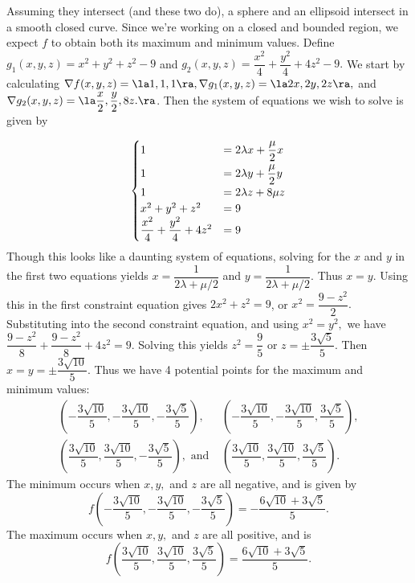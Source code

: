 {Assuming they intersect (and these two do), a sphere and an ellipsoid intersect in a smooth closed curve.  Since we're working on a closed and bounded region, we expect $f$ to obtain both its maximum and minimum values.  Define $g_1(x,y,z) = x^2 + y^2 + z^2 -  9$ and $g_2(x,y,z) = \dfrac{x^2}{4} + \dfrac{y^2}{4} + 4z^2 - 9.$ We start by calculating $\nabla f(x,y,z) = \la 1,1,1 \ra, \nabla g_1(x,y,z) = \la 2x,2y,2z\ra,$ and $\nabla g_2(x,y,z) = \la \dfrac{x}{2}, \dfrac{y}{2}, 8z. \ra$.  Then the system of equations we wish to solve is given by

\[
		\begin{cases}
			                                     1 & = 2\lambda x + \dfrac{\mu}{2} x \smallskip \\
			                                     1 & = 2\lambda y + \dfrac{\mu}{2}y  \\
			                                     1 & =2\lambda z + 8\mu z            \\
			                       x^2 + y^2 + z^2 & = 9                             \\
			\dfrac{x^2}{4} + \dfrac{y^2}{4} + 4z^2 & = 9
		\end{cases}\]
Though this looks like a daunting system of equations, solving for the $x$ and $y$ in the first two equations yields $x = \dfrac{1}{2\lambda + \mu/2}$ and $y = \dfrac{1}{2\lambda + \mu/2}$.  Thus $x = y$.  Using this in the first constraint equation gives $2x^2 + z^2 = 9$, or $x^2 = \dfrac{9 - z^2}{2}.$  Substituting into the second constraint equation, and using $x^2 = y^2,$ we have $\dfrac{9 - z^2}{8} + \dfrac{9 - z^2}{8} + 4z^2 = 9.$ Solving this yields $z^2 = \dfrac{9}{5}$ or $z =\pm \dfrac{3 \sqrt{5}}{5}$.  Then $x = y = \pm \dfrac{3\sqrt{10}}{5}.$  Thus we have 4 potential points for the maximum and minimum values:
	\[\begin{array}{ll}
	\left(- \dfrac{3\sqrt{10}}{5},-\dfrac{3\sqrt{10}}{5}, -\dfrac{3 \sqrt{5}}{5}\right), & \left(- \dfrac{3\sqrt{10}}{5},-\dfrac{3\sqrt{10}}{5}, \dfrac{3 \sqrt{5}}{5}\right), \\
	\left( \dfrac{3\sqrt{10}}{5},\dfrac{3\sqrt{10}}{5}, -\dfrac{3 \sqrt{5}}{5}\right),  \text{ and } &\left( \dfrac{3\sqrt{10}}{5},\dfrac{3\sqrt{10}}{5}, \dfrac{3 \sqrt{5}}{5}\right). \end{array}
	\]
The minimum occurs when $x, y,$ and $z$ are all negative, and is given by $$f\left(- \dfrac{3\sqrt{10}}{5},-\dfrac{3\sqrt{10}}{5}, -\dfrac{3 \sqrt{5}}{5}\right) = -\dfrac{6\sqrt{10} + 3\sqrt{5}}{5}.$$  The maximum occurs when $x,y,$ and $z$ are all positive, and is $$f\left( \dfrac{3\sqrt{10}}{5},\dfrac{3\sqrt{10}}{5}, \dfrac{3 \sqrt{5}}{5}\right) = \dfrac{6\sqrt{10} + 3\sqrt{5}}{5}.$$
}

